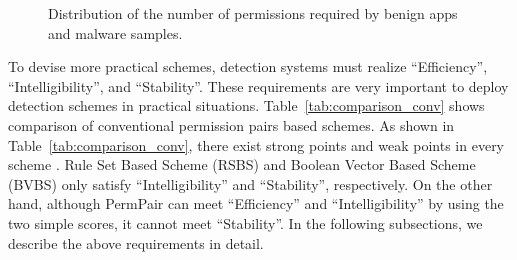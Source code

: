 \documentclass{ieeeaccess}
\newcommand{\mytablename}{Table}
\begin{document}
\begin{figure}[t]
{  } 
  \caption{Distribution of the number of permissions required by benign apps and malware samples.}
  \label{fig:permission_distribution}
\end{figure}
To devise more practical schemes, detection systems must realize ``Efficiency'', ``Intelligibility'', and ``Stability''.
These requirements are very important to deploy detection schemes in practical situations.
\mytablename~\ref{tab:comparison_conv} shows comparison of conventional permission pairs based schemes.
As shown in \mytablename~\ref{tab:comparison_conv}, there exist strong points and weak points in every scheme \cite{liang2014permission, liu2014two, arora2019permpair}.
Rule Set Based Scheme (RSBS) \cite{liang2014permission} and Boolean Vector Based Scheme (BVBS) \cite{liu2014two} only satisfy ``Intelligibility'' and ``Stability'', respectively.
On the other hand, although PermPair \cite{arora2019permpair} can meet ``Efficiency'' and ``Intelligibility'' by using the two simple scores, it cannot meet ``Stability''.
In the following subsections, we describe the above requirements in detail.
\end{document}
